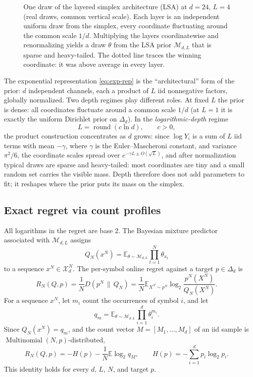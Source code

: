 \documentclass[11pt]{article}
\newcommand{\KL}{D}
\newcommand{\E}{\mathbb{E}}
\newcommand{\Nseq}{N}
\newcommand{\model}{\mathcal{M}_{d,L}}
\begin{document}
\begin{figure}[htp]
  \caption{One draw of the layered simplex architecture (LSA) at $d=24$,
  $L=4$ (real draws, common vertical scale). Each layer is an independent
  uniform draw from the simplex, every coordinate fluctuating around the
  common scale $1/d$. Multiplying the layers coordinatewise and renormalizing
  yields a draw $\theta$ from the LSA prior $\mathcal{M}_{d,L}$ that is
  sparse and heavy-tailed. The dotted line traces the winning coordinate:
  it was above average in every layer.}
  \label{fig:construction}
\end{figure}
The exponential representation \eqref{eq:exp-rep} is the
``architectural'' form of the prior: \(d\) independent channels, each a
product of \(L\) iid nonnegative factors, globally normalized.
Two depth regimes play different roles. At fixed \(L\) the prior is
dense: all coordinates fluctuate around a common scale \(1/d\) (at
\(L=1\) it is exactly the uniform Dirichlet prior on \(\Delta_d\)).
In
the \emph{logarithmic-depth} regime
\[
  L=\operatorname{round}(c\ln d),
  \qquad c>0,
\]
the product construction concentrates as \(d\) grows: since
\(\log Y_i\) is a sum of \(L\) iid terms with mean $-\gamma$, where $\gamma$ is the Euler--Mascheroni
constant, and variance
\(\pi^2/6\), the coordinate scales spread over
\(e^{-\gamma L\pm O(\sqrt L)}\), and after normalization typical draws are
sparse and heavy-tailed: most coordinates are tiny and a small random set
carries the visible mass.  Depth therefore does not add parameters to fit; it
reshapes where the prior puts its mass on the simplex.
\subsection{Exact regret via count profiles}
\label{sec:exact-regret}
All logarithms in the regret are base \(2\).  The Bayesian mixture predictor
associated with \(\model\) assigns
\[
  Q_\Nseq(x^\Nseq)
  =
  \E_{\theta\sim\model}
  \prod_{t=1}^{\Nseq}\theta_{x_t}
\]
to a sequence \(x^\Nseq\in\mathcal X_d^\Nseq\).  The per-symbol online regret
against a target \(p\in\Delta_d\) is
\[
  R_\Nseq(Q,p)
  =
  \frac{1}{\Nseq}\KL(p^\Nseq\,\|\,Q_\Nseq)
  =
  \frac{1}{\Nseq}
  \E_{X^\Nseq\sim p^\Nseq}
  \log_2
  \frac{p^\Nseq(X^\Nseq)}{Q_\Nseq(X^\Nseq)} .
\]
For a sequence \(x^\Nseq\), let \(m_i\) count the occurrences of symbol
\(i\), and let
\[
  q_m
  =
  \E_{\theta\sim\model}
  \prod_{i=1}^d \theta_i^{m_i} .
\]
Since \(Q_\Nseq(x^\Nseq)=q_m\), and the count vector
\(M=[M_1,\ldots,M_d]\) of an iid sample is
\(\operatorname{Multinomial}(\Nseq,p)\)-distributed,
\begin{equation}
\label{eq:regret-counts}
  R_\Nseq(Q,p)
  =
  -H(p)
  -
  \frac{1}{\Nseq}
  \E\log_2 q_M,
  \qquad
  H(p)=-\sum_{i=1}^d p_i\log_2 p_i .
\end{equation}
This identity holds for every \(d\), \(L\), \(\Nseq\), and target \(p\).
\end{document}
